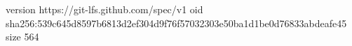 version https://git-lfs.github.com/spec/v1
oid sha256:539c645d8597b6813d2ef304d9f76f57032303e50ba1d1be0d76833abdeafe45
size 564
